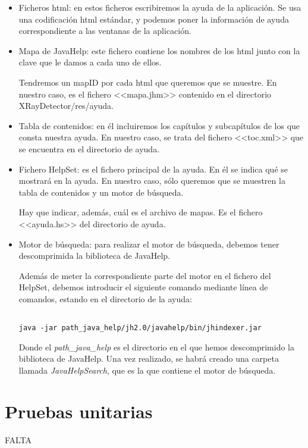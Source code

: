 \begin{itemize}
\item Ficheros html: en estos ficheros escribiremos la ayuda de la aplicación. Se usa una codificación html estándar, y podemos poner la información de ayuda correspondiente a las ventanas de la aplicación.
\item Mapa de JavaHelp: este fichero contiene los nombres de los html junto con la clave que le damos a cada uno de ellos.

Tendremos un mapID por cada html que queremos que se muestre. En nuestro caso, es el fichero <<mapa.jhm>> contenido en el directorio XRayDetector/res/ayuda.
\item Tabla de contenidos: en él incluiremos los capítulos y subcapítulos de los que consta nuestra ayuda. En nuestro caso, se trata del fichero <<toc.xml>> que se encuentra en el directorio de ayuda.
\item Fichero HelpSet: es el fichero principal de la ayuda. En él se indica qué se mostrará en la ayuda. En nuestro caso, sólo queremos que se muestren la tabla de contenidos y un motor de búsqueda.

Hay que indicar, además, cuál es el archivo de mapas. Es el fichero <<ayuda.hs>> del directorio de ayuda.
\item Motor de búsqueda: para realizar el motor de búsqueda, debemos tener descomprimida la biblioteca de JavaHelp.

Además de meter la correspondiente parte del motor en el fichero del HelpSet, debemos introducir el siguiente comando mediante línea de comandos, estando en el directorio de la ayuda:

\begin{verbatim}

java -jar path_java_help/jh2.0/javahelp/bin/jhindexer.jar

\end{verbatim}

Donde el \textit{path\_java\_help} es el directorio en el que hemos descomprimido la biblioteca de JavaHelp.
Una vez realizado, se habrá creado una carpeta llamada \textit{JavaHelpSearch}, que es la que contiene el motor de búsqueda.
\end{itemize}

\section{Pruebas unitarias}
FALTA

 
